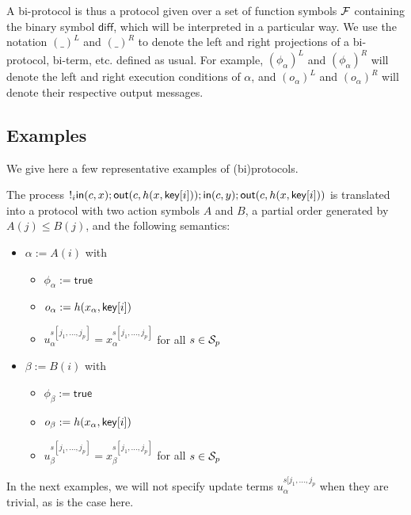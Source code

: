 A bi-protocol is thus a protocol given over a set of function symbols
$\mathcal{F}$ containing the binary symbol $\mathsf{diff}$,
which will be interpreted in a particular way.
We use the notation $(\_)^L$ and $(\_)^R$ to denote the left and right 
projections of a bi-protocol, bi-term, etc. defined as usual.
For example, $(\phi_{\alpha})^L$ and $(\phi_{\alpha})^R$ will denote
the left and right execution conditions of $\alpha$, and
$(o_{\alpha})^L$ and $(o_{\alpha})^R$ will denote their respective
output messages.

\subsection{Examples}

We give here a few representative examples of (bi)protocols.

\begin{example}
  The process $!_i 
  \mathsf{in}(c,x);\mathsf{out}(c,h(x,\mathsf{key}[i]));\mathsf{in}(c,y);\mathsf{out}(c,h(x,\mathsf{key}[i]))$
  is translated into a protocol with two action symbols $A$ and $B$,
  a partial order generated by $A(j) \leq B(j)$, and the following
  semantics:
  \begin{itemize}
    \item $\alpha := A(i)$ with
      \begin{itemize}
        \item $\phi_\alpha := \mathsf{true}$
        \item $o_\alpha := h(x_\alpha,\mathsf{key}[i])$
        \item $u_\alpha^{s[j_1,\ldots,j_p]} = x_\alpha^{s[j_1,\ldots,j_p]}$
          for all $s\in\mathcal{S}_p$
      \end{itemize}
    \item $\beta := B(i)$ with
      \begin{itemize}
        \item $\phi_\beta := \mathsf{true}$
        \item $o_\beta := h(x_\alpha,\mathsf{key}[i])$
        \item $u_\beta^{s[j_1,\ldots,j_p]} = x_\beta^{s[j_1,\ldots,j_p]}$
          for all $s\in\mathcal{S}_p$
      \end{itemize}
  \end{itemize}
  In the next examples, we will not specify update terms 
  $u_\alpha^{s[j_1,\ldots,j_p}$ when they are trivial, as is the case
  here.
\end{example}

